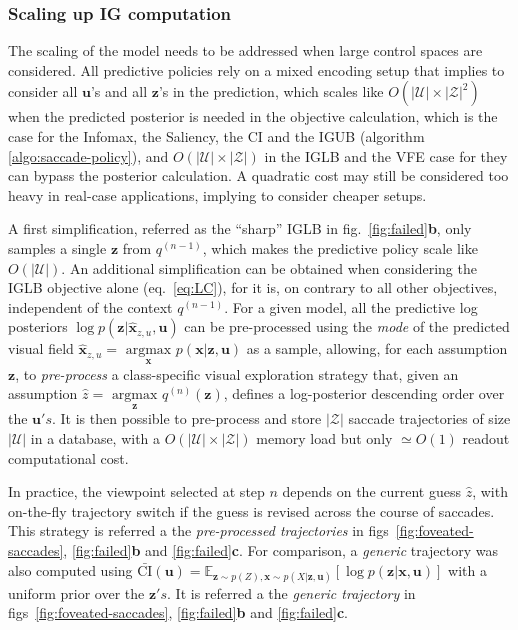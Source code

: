 \documentclass[12pt,twoside,openright]{article}
\begin{document}
\subsubsection{Scaling up IG computation}
The scaling of the model needs to be addressed when large control spaces are considered. All predictive policies rely on a mixed encoding setup that implies to consider all $\boldsymbol{u}$'s and all $\boldsymbol{z}$'s in the prediction, which scales like $O(|\mathcal{U}|\times|\mathcal{Z}|^2)$ when the predicted posterior is needed in the objective calculation, which is the case for the Infomax, the Saliency, the CI and the IGUB (algorithm \ref{algo:saccade-policy}), and $O(|\mathcal{U}|\times|\mathcal{Z}|)$ in the {\color{Purple}IGLB} and the VFE case for they can bypass the posterior calculation. A quadratic cost may still be considered too heavy in real-case applications, implying to consider cheaper setups. 

A first simplification, referred as the ``sharp'' IGLB in  fig.~\ref{fig:failed}\textbf{b}, only samples a single $\boldsymbol{z}$ from $q^{(n-1)}$, which makes the predictive policy scale like $O(|\mathcal{U}|)$. An additional simplification can be obtained when considering the IGLB objective alone (eq.~\ref{eq:LC}), for it is, on contrary to all other objectives, independent of the context $q^{(n-1)}$. For a given model, all the predictive log posteriors $\log p(\boldsymbol{z}|\hat{\boldsymbol{x}}_{z,u}, \boldsymbol{u})$ can be pre-processed using the \emph{mode} of the predicted visual field $\hat{\boldsymbol{x}}_{z,u} = \underset{\boldsymbol{x}}{\text{ argmax }} p(\boldsymbol{x}|\boldsymbol{z}, \boldsymbol{u})$ as a sample, allowing, for each assumption $\boldsymbol{z}$, to \emph{pre-process} a class-specific visual exploration strategy that, given an assumption $\hat{z} = \underset{\boldsymbol{\boldsymbol{z}}}{\text{ argmax }} q^{(n)}(\boldsymbol{z})$, defines a log-posterior descending order over the $\boldsymbol{u}'s$. It is then possible to pre-process and store $|\mathcal{Z}|$ saccade trajectories of size $|\mathcal{U}|$ in a database, with a $O(|\mathcal{U}|\times|\mathcal{Z}|)$ memory load but only $\simeq O(1)$ readout computational cost. 

In practice, the viewpoint selected at step $n$ depends on the current guess $\hat{z}$, with on-the-fly trajectory switch if the guess is revised across the course of saccades. This strategy is referred a the \emph{pre-processed trajectories} in figs~\ref{fig:foveated-saccades}, \ref{fig:failed}\textbf{b} and \ref{fig:failed}\textbf{c}.
For comparison, a \emph{generic} trajectory was also computed using $\bar{\text{CI}}(\boldsymbol{u})
= \mathbb{E}_{\boldsymbol{z} \sim p(Z), \boldsymbol{x} \sim p(X|\boldsymbol{z}, \boldsymbol{u})}\left[ \log p(\boldsymbol{z}|\boldsymbol{x}, \boldsymbol{u})\right]$ with a uniform prior over the $\boldsymbol{z}'s$.  
It is referred a the \emph{generic trajectory} in figs~\ref{fig:foveated-saccades}, \ref{fig:failed}\textbf{b} and \ref{fig:failed}\textbf{c}.
\end{document}

